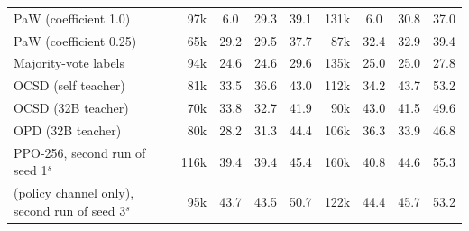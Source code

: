 \begin{tabular}{l r c c c r c c c }
PaW (coefficient 1.0) & 97k & 6.0\sigup{} & 29.3\sigup{} & 39.1 & 131k & 6.0\sigup{} & 30.8\sigup{} & 37.0 \\
PaW (coefficient 0.25) & 65k & 29.2\sigup{} & 29.5\sigup{} & 37.7 & 87k & 32.4\sigup{} & 32.9\sigup{} & 39.4 \\
Majority-vote labels & 94k & 24.6\sigup{} & 24.6\sigup{} & 29.6 & 135k & 25.0\sigup{} & 25.0\sigup{} & 27.8 \\
OCSD (self teacher) & 81k & 33.5\sigup{} & 36.6\sigup{} & 43.0 & 112k & 34.2\sigup{} & 43.7\sigup{} & 53.2 \\
OCSD (32B teacher) & 70k & 33.8\sigup{} & 32.7\sigup{} & 41.9 & 90k & 43.0\sigup{} & 41.5\sigup{} & 49.6 \\
OPD (32B teacher) & 80k & 28.2\sigup{} & 31.3\sigup{} & 44.4 & 106k & 36.3\sigup{} & 33.9\sigup{} & 46.8 \\
PPO-256, second run of seed 1$^{s}$ & 116k & 39.4 & 39.4 & 45.4 & 160k & 40.8 & 44.6 & 55.3 \\
\wmppo{} (policy channel only), second run of seed 3$^{s}$ & 95k & 43.7 & 43.5 & 50.7 & 122k & 44.4 & 45.7 & 53.2 \\
\bottomrule
\end{tabular}
